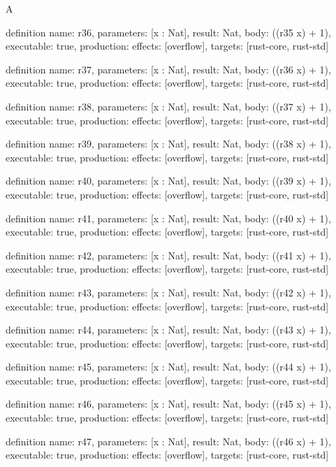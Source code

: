 \begin{lexlean}{A}
\begin{semanticmodule}
definition{
  name: r36,
  parameters: [x : Nat],
  result: Nat,
  body: ((r35 x) + 1),
  executable: true,
  production: {effects: [overflow], targets: [rust-core, rust-std]}
}

definition{
  name: r37,
  parameters: [x : Nat],
  result: Nat,
  body: ((r36 x) + 1),
  executable: true,
  production: {effects: [overflow], targets: [rust-core, rust-std]}
}

definition{
  name: r38,
  parameters: [x : Nat],
  result: Nat,
  body: ((r37 x) + 1),
  executable: true,
  production: {effects: [overflow], targets: [rust-core, rust-std]}
}

definition{
  name: r39,
  parameters: [x : Nat],
  result: Nat,
  body: ((r38 x) + 1),
  executable: true,
  production: {effects: [overflow], targets: [rust-core, rust-std]}
}

definition{
  name: r40,
  parameters: [x : Nat],
  result: Nat,
  body: ((r39 x) + 1),
  executable: true,
  production: {effects: [overflow], targets: [rust-core, rust-std]}
}

definition{
  name: r41,
  parameters: [x : Nat],
  result: Nat,
  body: ((r40 x) + 1),
  executable: true,
  production: {effects: [overflow], targets: [rust-core, rust-std]}
}

definition{
  name: r42,
  parameters: [x : Nat],
  result: Nat,
  body: ((r41 x) + 1),
  executable: true,
  production: {effects: [overflow], targets: [rust-core, rust-std]}
}

definition{
  name: r43,
  parameters: [x : Nat],
  result: Nat,
  body: ((r42 x) + 1),
  executable: true,
  production: {effects: [overflow], targets: [rust-core, rust-std]}
}

definition{
  name: r44,
  parameters: [x : Nat],
  result: Nat,
  body: ((r43 x) + 1),
  executable: true,
  production: {effects: [overflow], targets: [rust-core, rust-std]}
}

definition{
  name: r45,
  parameters: [x : Nat],
  result: Nat,
  body: ((r44 x) + 1),
  executable: true,
  production: {effects: [overflow], targets: [rust-core, rust-std]}
}

definition{
  name: r46,
  parameters: [x : Nat],
  result: Nat,
  body: ((r45 x) + 1),
  executable: true,
  production: {effects: [overflow], targets: [rust-core, rust-std]}
}

definition{
  name: r47,
  parameters: [x : Nat],
  result: Nat,
  body: ((r46 x) + 1),
  executable: true,
  production: {effects: [overflow], targets: [rust-core, rust-std]}
}


\end{semanticmodule}
\end{lexlean}
